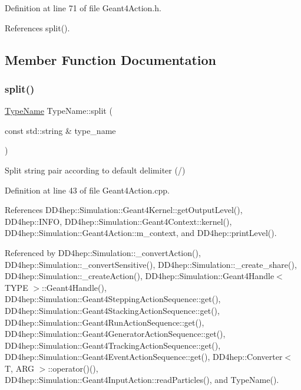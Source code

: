 Definition at line 71 of file Geant4\+Action.\+h.



References split().



\subsection{Member Function Documentation}
\hypertarget{class_d_d4hep_1_1_simulation_1_1_type_name_a0f04be3a591eaaa2d36cbd01d3274dd2}{}\label{class_d_d4hep_1_1_simulation_1_1_type_name_a0f04be3a591eaaa2d36cbd01d3274dd2} 
\subsubsection{\texorpdfstring{split()}{split()}\hspace{0.1cm}{\footnotesize\ttfamily [1/2]}}
{\footnotesize\ttfamily \hyperlink{class_d_d4hep_1_1_simulation_1_1_type_name}{Type\+Name} Type\+Name\+::split (\begin{DoxyParamCaption}\item[{const std\+::string \&}]{type\+\_\+name }\end{DoxyParamCaption})\hspace{0.3cm}{\ttfamily [static]}}



Split string pair according to default delimiter (\textquotesingle{}/\textquotesingle{}) 



Definition at line 43 of file Geant4\+Action.\+cpp.



References D\+D4hep\+::\+Simulation\+::\+Geant4\+Kernel\+::get\+Output\+Level(), D\+D4hep\+::\+I\+N\+FO, D\+D4hep\+::\+Simulation\+::\+Geant4\+Context\+::kernel(), D\+D4hep\+::\+Simulation\+::\+Geant4\+Action\+::m\+\_\+context, and D\+D4hep\+::print\+Level().



Referenced by D\+D4hep\+::\+Simulation\+::\+\_\+convert\+Action(), D\+D4hep\+::\+Simulation\+::\+\_\+convert\+Sensitive(), D\+D4hep\+::\+Simulation\+::\+\_\+create\+\_\+share(), D\+D4hep\+::\+Simulation\+::\+\_\+create\+Action(), D\+D4hep\+::\+Simulation\+::\+Geant4\+Handle$<$ T\+Y\+P\+E $>$\+::\+Geant4\+Handle(), D\+D4hep\+::\+Simulation\+::\+Geant4\+Stepping\+Action\+Sequence\+::get(), D\+D4hep\+::\+Simulation\+::\+Geant4\+Stacking\+Action\+Sequence\+::get(), D\+D4hep\+::\+Simulation\+::\+Geant4\+Run\+Action\+Sequence\+::get(), D\+D4hep\+::\+Simulation\+::\+Geant4\+Generator\+Action\+Sequence\+::get(), D\+D4hep\+::\+Simulation\+::\+Geant4\+Tracking\+Action\+Sequence\+::get(), D\+D4hep\+::\+Simulation\+::\+Geant4\+Event\+Action\+Sequence\+::get(), D\+D4hep\+::\+Converter$<$ T, A\+R\+G $>$\+::operator()(), D\+D4hep\+::\+Simulation\+::\+Geant4\+Input\+Action\+::read\+Particles(), and Type\+Name().

